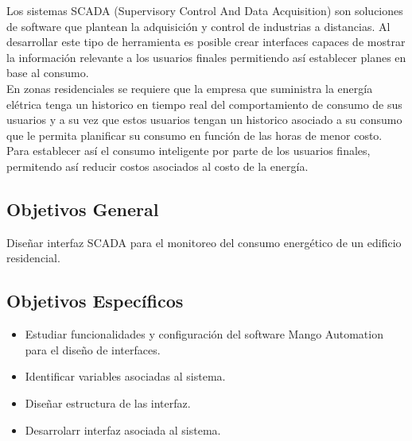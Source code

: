     Los sistemas SCADA (Supervisory Control And Data Acquisition) son soluciones de software que plantean la adquisición y 
    control de industrias a distancias. Al desarrollar este tipo de herramienta es posible crear interfaces capaces de 
    mostrar la información relevante a los usuarios finales permitiendo así establecer planes en base al consumo.\\

    En zonas residenciales se requiere que la empresa que suministra la energía elétrica tenga un historico en tiempo real 
    del comportamiento de consumo de sus usuarios y a su vez que estos usuarios tengan un historico asociado a su consumo 
    que le permita planificar su consumo en función de las horas de menor costo. Para establecer así el consumo inteligente 
    por parte de los usuarios finales, permitendo así reducir costos asociados al costo de la energía.

\subsection{Objetivos General}
    Diseñar interfaz SCADA para el 
    monitoreo del consumo energético de un 
    edificio residencial.

\subsection{Objetivos Específicos}
\begin{itemize}
    \item Estudiar funcionalidades y configuración
    del software Mango Automation para el diseño de 
    interfaces.
    \item Identificar variables asociadas al sistema.
    \item Diseñar estructura de las interfaz.
    \item Desarrolarr interfaz asociada al sistema.
\end{itemize}
\newpage